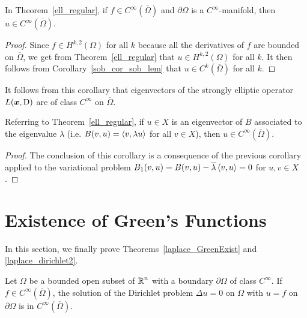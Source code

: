 \begin{cor} \label{ell_fCi_uCi}
In Theorem~\ref{ell_regular}, if $f \in C^\infty(\overline{\Omega})$
and $\partial \Omega$ is a $C^\infty$-manifold, then
$u\in C^\infty(\overline{\Omega})$.
\end{cor}

\begin{proof}
Since $\displaystyle f \in H^{k,2}(\Omega)$ for all $k$
because all the derivatives of $f$ are bounded on $\overline{\Omega}$, 
we get from
Theorem~\ref{ell_regular} that $\displaystyle u \in H^{k,2}(\Omega)$
for all $k$.  It then follows from Corollary~\ref{sob_cor_sob_lem} that
$\displaystyle u \in C^k(\overline{\Omega})$ for all $k$.
\end{proof}

It follows from this corollary that eigenvectors of the strongly
elliptic operator $L({\bm{x}},\operatorname{D})$ are of class $\displaystyle C^\infty$ on
$\overline{\Omega}$.

\begin{cor}
Referring to Theorem~\ref{ell_regular}, if $u \in X$ is an eigenvector
of $B$ associated to the eigenvalue $\lambda$ (i.e.
$B(v,u) = \left\langle{v} , {\lambda u}\right\rangle$ for all $v \in X$), then
$\displaystyle u \in C^\infty(\overline{\Omega})$.
\end{cor}

\begin{proof}
The conclusion of this corollary is a consequence of the previous
corollary applied to the variational problem
$B_1(v,u) = B(v,u) - \overline{\lambda}\left\langle{v} , {u}\right\rangle = 0$ for $u,v \in X$.
\end{proof}

\section{Existence of Green's Functions} \label{ell_GreenF}

In this section, we finally prove Theorems~\ref{laplace_GreenExist}
and \ref{laplace_dirichlet2}.

\begin{prop} \label{ell_GreenF_prop}
Let $\Omega$ be a bounded open subset of $\displaystyle \mathbb{R}^n$ with a boundary
$\partial \Omega$ of class $\displaystyle C^\infty$.  If
$\displaystyle f \in C^\infty(\overline{\Omega})$,
the solution of the Dirichlet problem $\Delta u = 0$ on $\Omega$ with
$u=f$ on $\partial \Omega$ is in $\displaystyle C^\infty(\overline{\Omega})$.
\end{prop}

